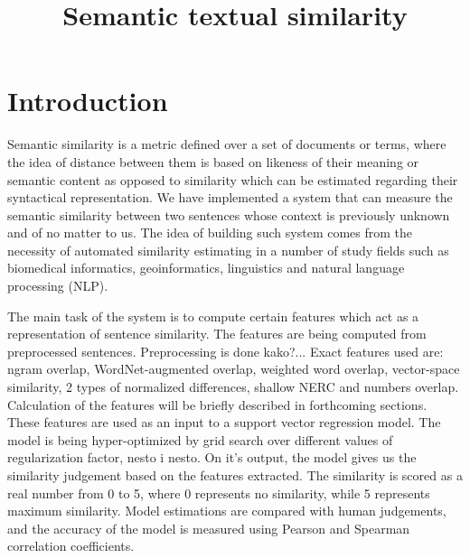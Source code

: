 \documentclass[10pt, a4paper]{article}
\title{Semantic textual similarity}
\begin{document}
\maketitleabstract

\section{Introduction}



Semantic similarity is a metric defined over a set of documents or terms, where the idea of distance between them is based on likeness of their meaning or semantic content as opposed to similarity which can be estimated regarding their syntactical representation. 
We have implemented a system that can measure the semantic similarity between two sentences whose context is previously unknown and of no matter to us. The idea of building such system comes from the necessity of automated similarity estimating in a number of study fields such as biomedical informatics, geoinformatics, linguistics and natural language processing (NLP).

The main task of the system is to compute certain features which act as a representation of sentence similarity. The features are being computed from preprocessed sentences. Preprocessing is done kako?... Exact features used are: ngram overlap, WordNet-augmented overlap, weighted word overlap, vector-space similarity, 2 types of normalized differences, shallow NERC and numbers overlap. Calculation of the features will be briefly described in forthcoming sections. These features are used as an input to a support vector regression model. The model is being hyper-optimized by grid search over different values of regularization factor, nesto i nesto. On it's output, the model gives us the similarity judgement based on the features extracted. The similarity is scored as a real number from 0 to 5, where 0 represents no similarity, while 5 represents maximum similarity. Model estimations are compared with human judgements, and the accuracy of the model is measured using Pearson and Spearman correlation coefficients.
\end{document}
